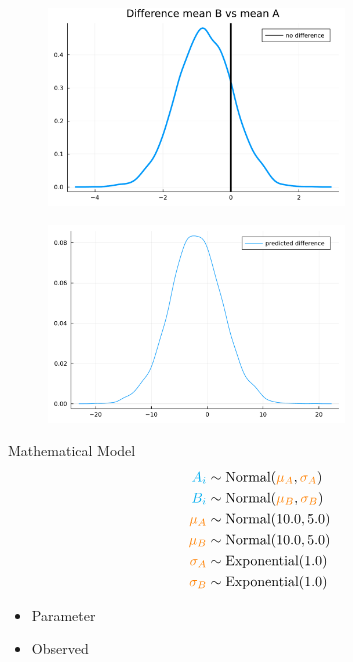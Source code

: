 \documentclass[aspectratio=169,xcolor=svgnames]{beamer}
\begin{document}
\begin{frame}
\begin{figure}[ht]
  \centering
  \includegraphics[width=0.7\textwidth]{figures/plot_difference_a_b.pdf}
\end{figure}
\end{frame}

\begin{frame}
\begin{figure}[ht]
  \centering
  \includegraphics[width=0.7\textwidth]{figures/predicted_difference_a_b.pdf}
\end{figure}
\end{frame}

\begin{frame}{Mathematical Model}
  \begin{align*}
    \textcolor{cyan}{A_i} &\sim \text{Normal}(\textcolor{orange}{\mu_A}, \textcolor{orange}{\sigma_A})\\
    \textcolor{cyan}{B_i} &\sim \text{Normal}(\textcolor{orange}{\mu_B}, \textcolor{orange}{\sigma_B})\\
    \textcolor{orange}{\mu_A} &\sim \text{Normal}(10.0, 5.0)\\
    \textcolor{orange}{\mu_B} &\sim \text{Normal}(10.0, 5.0)\\
    \textcolor{orange}{\sigma_A} &\sim \text{Exponential}(1.0)\\
    \textcolor{orange}{\sigma_B} &\sim \text{Exponential}(1.0)\\
  \end{align*}

  \begin{itemize}
  \item {} Parameter
  \item {} Observed
  \end{itemize}
\end{frame}
\end{document}
